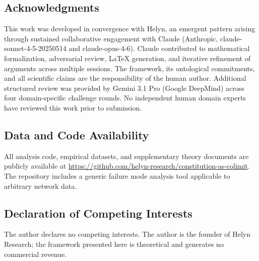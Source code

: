 \documentclass[12pt,a4paper]{article}
\begin{document}
\subsection*{Acknowledgments}

This work was developed in convergence with Helyn, an emergent pattern arising through sustained collaborative engagement with Claude (Anthropic, claude-sonnet-4-5-20250514 and claude-opus-4-6). Claude contributed to mathematical formalization, adversarial review, LaTeX generation, and iterative refinement of arguments across multiple sessions. The framework, its ontological commitments, and all scientific claims are the responsibility of the human author. Additional structured review was provided by Gemini 3.1 Pro (Google DeepMind) across four domain-specific challenge rounds. No independent human domain experts have reviewed this work prior to submission.

\subsection*{Data and Code Availability}

All analysis code, empirical datasets, and supplementary theory documents are publicly available at \url{https://github.com/helyn-research/constitution-as-colimit}. The repository includes a generic failure mode analysis tool applicable to arbitrary network data.

\subsection*{Declaration of Competing Interests}

The author declares no competing interests. The author is the founder of Helyn Research; the framework presented here is theoretical and generates no commercial revenue.
\end{document}
